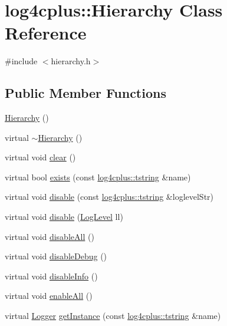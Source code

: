 \hypertarget{classlog4cplus_1_1Hierarchy}{\section{log4cplus\-:\-:Hierarchy Class Reference}
\label{classlog4cplus_1_1Hierarchy}
}


{\ttfamily \#include $<$hierarchy.\-h$>$}

\subsection*{Public Member Functions}
\begin{DoxyCompactItemize}
\item 
\hyperlink{classlog4cplus_1_1Hierarchy_ade70368f1b18517ad8e0e2a2a5006d92}{Hierarchy} ()
\item 
virtual \hyperlink{classlog4cplus_1_1Hierarchy_ae3e5257eca6d6b594d82b94d402043ec}{$\sim$\-Hierarchy} ()
\item 
virtual void \hyperlink{classlog4cplus_1_1Hierarchy_a24fecebf76cb5e8c78eed5ee52c13ca2}{clear} ()
\item 
virtual bool \hyperlink{classlog4cplus_1_1Hierarchy_afb304d18e5565662864ee60506d751b0}{exists} (const \hyperlink{namespacelog4cplus_a3c9287f6ebcddc50355e29d71152117b}{log4cplus\-::tstring} \&name)
\item 
virtual void \hyperlink{classlog4cplus_1_1Hierarchy_adb298220a82bc8b0307539105ab73ae7}{disable} (const \hyperlink{namespacelog4cplus_a3c9287f6ebcddc50355e29d71152117b}{log4cplus\-::tstring} \&loglevel\-Str)
\item 
virtual void \hyperlink{classlog4cplus_1_1Hierarchy_a943f6d7b230fd7a7793a1c7f5a52b56c}{disable} (\hyperlink{namespacelog4cplus_abd332cc8c98fefcbbdcf57b6b3867de9}{Log\-Level} ll)
\item 
virtual void \hyperlink{classlog4cplus_1_1Hierarchy_ad838286679614098f433e28a4565b15b}{disable\-All} ()
\item 
virtual void \hyperlink{classlog4cplus_1_1Hierarchy_a7e36764558f00fda4e21e518a713ba0e}{disable\-Debug} ()
\item 
virtual void \hyperlink{classlog4cplus_1_1Hierarchy_a80165fb44a8dc1272808309c8e817d68}{disable\-Info} ()
\item 
virtual void \hyperlink{classlog4cplus_1_1Hierarchy_ac656131db5fd68886f6d1ba1238f8128}{enable\-All} ()
\item 
virtual \hyperlink{classlog4cplus_1_1Logger}{Logger} \hyperlink{classlog4cplus_1_1Hierarchy_ae255db6950dff79f2679acb9c2fe55e1}{get\-Instance} (const \hyperlink{namespacelog4cplus_a3c9287f6ebcddc50355e29d71152117b}{log4cplus\-::tstring} \&name)

\end{DoxyCompactItemize}
